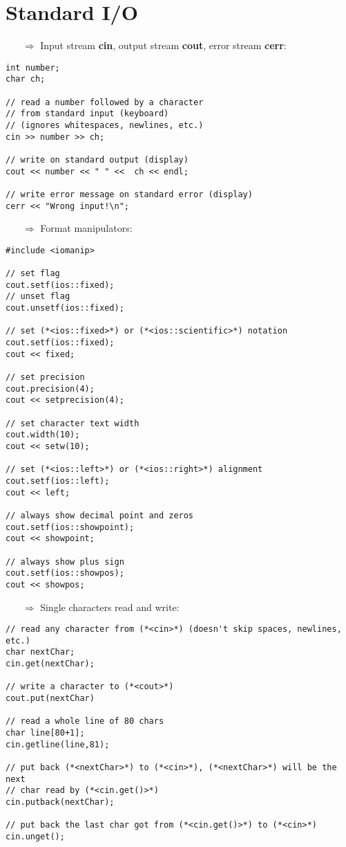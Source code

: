 \documentclass[10pt]{article}
\begin{document}
\section{Standard I/O}
\small
\begin{enumerate}
\item[$\Rightarrow$] Input stream \textbf{cin}, output stream \textbf{cout}, error stream \textbf{cerr}:
\end{enumerate}
\begin{lstlisting}
int number;
char ch;

// read a number followed by a character
// from standard input (keyboard)
// (ignores whitespaces, newlines, etc.)
cin >> number >> ch;

// write on standard output (display)
cout << number << " " <<  ch << endl;

// write error message on standard error (display)
cerr << "Wrong input!\n";
\end{lstlisting}
\begin{enumerate}
\item[$\Rightarrow$] Format manipulators:
\end{enumerate}
\begin{lstlisting}
#include <iomanip>

// set flag
cout.setf(ios::fixed);
// unset flag
cout.unsetf(ios::fixed);

// set (*<ios::fixed>*) or (*<ios::scientific>*) notation
cout.setf(ios::fixed);
cout << fixed;

// set precision
cout.precision(4);
cout << setprecision(4);

// set character text width
cout.width(10);
cout << setw(10);

// set (*<ios::left>*) or (*<ios::right>*) alignment
cout.setf(ios::left);
cout << left;

// always show decimal point and zeros
cout.setf(ios::showpoint);
cout << showpoint;

// always show plus sign
cout.setf(ios::showpos);
cout << showpos;
\end{lstlisting}
\begin{enumerate}
\item[$\Rightarrow$] Single characters read and write:
\end{enumerate}
\begin{lstlisting}
// read any character from (*<cin>*) (doesn't skip spaces, newlines, etc.)
char nextChar;
cin.get(nextChar);

// write a character to (*<cout>*)
cout.put(nextChar)

// read a whole line of 80 chars
char line[80+1];
cin.getline(line,81);

// put back (*<nextChar>*) to (*<cin>*), (*<nextChar>*) will be the next 
// char read by (*<cin.get()>*)
cin.putback(nextChar);

// put back the last char got from (*<cin.get()>*) to (*<cin>*)
cin.unget();
\end{lstlisting}
\end{document}
